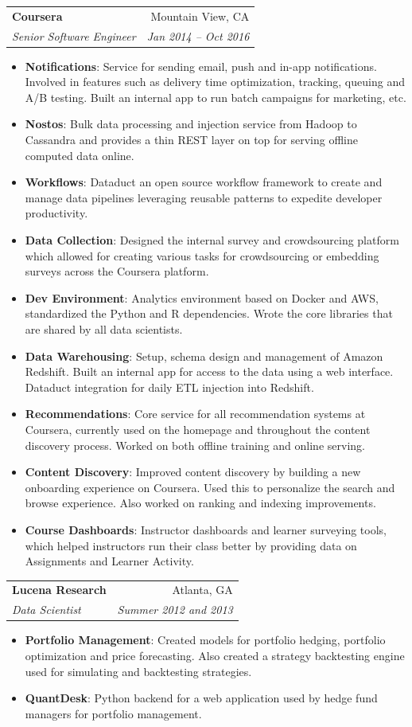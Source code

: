 \documentclass[letterpaper,11pt]{article}
\makeatletter
\newcommand{\resumeItem}[2]{
  \item\small{
    \textbf{#1}{: #2 \vspace{-2pt}}
  }
}
\newcommand{\resumeSubheading}[4]{
  \vspace{-1pt}\item
    \begin{tabular*}{\linewidth}[t]{l@{\extracolsep{\fill}}r}
      \textbf{#1} & #2 \\
      \textit{\small #3} & \textit{\small #4} \\
    \end{tabular*}\vspace{-5pt}
}
\newcommand{\resumeItemListStart}{\begin{itemize}[leftmargin=1.5em]}
\newcommand{\resumeItemListEnd}{\end{itemize}\vspace{-5pt}}
\makeatother
\begin{document}
    \resumeSubheading
      {Coursera}{Mountain View, CA}
      {Senior Software Engineer}{Jan 2014 -- Oct 2016}
      \resumeItemListStart
        \resumeItem{Notifications}
          {Service for sending email, push and in-app notifications. Involved in features such as delivery time optimization, tracking, queuing and A/B testing. Built an internal app to run batch campaigns for marketing, etc.}
        \resumeItem{Nostos}
          {Bulk data processing and injection service from Hadoop to Cassandra and provides a thin REST layer on top for serving offline computed data online.}
        \resumeItem{Workflows}
          {Dataduct an open source workflow framework to create and manage data pipelines leveraging reusable patterns to expedite developer productivity.}
        \resumeItem{Data Collection}
          {Designed the internal survey and crowdsourcing platform which allowed for creating various tasks for crowdsourcing or embedding surveys across the Coursera platform.}
        \resumeItem{Dev Environment}
          {Analytics environment based on Docker and AWS, standardized the Python and R dependencies. Wrote the core libraries that are shared by all data scientists.}
        \resumeItem{Data Warehousing}
          {Setup, schema design and management of Amazon Redshift. Built an internal app for access to the data using a web interface. Dataduct integration for daily ETL injection into Redshift.}
        \resumeItem{Recommendations}
          {Core service for all recommendation systems at Coursera, currently used on the homepage and throughout the content discovery process. Worked on both offline training and online serving.}
        \resumeItem{Content Discovery}
          {Improved content discovery by building a new onboarding experience on Coursera. Used this to personalize the search and browse experience. Also worked on ranking and indexing improvements.}
        \resumeItem{Course Dashboards}
          {Instructor dashboards and learner surveying tools, which helped instructors run their class better by providing data on Assignments and Learner Activity.}
      \resumeItemListEnd

    \resumeSubheading
      {Lucena Research}{Atlanta, GA}
      {Data Scientist}{Summer 2012 and 2013}
      \resumeItemListStart
        \resumeItem{Portfolio Management}
          {Created models for portfolio hedging, portfolio optimization and price forecasting. Also created a strategy backtesting engine used for simulating and backtesting strategies.}
        \resumeItem{QuantDesk}
          {Python backend for a web application used by hedge fund managers for portfolio management.}
      \resumeItemListEnd
\end{document}
